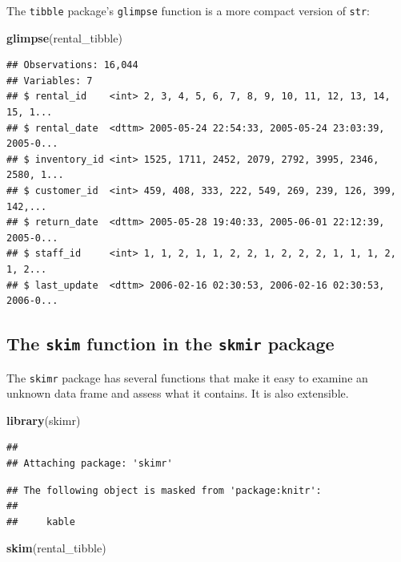 \documentclass[]{book}
\newenvironment{Shaded}{\begin{snugshade}}{\end{snugshade}}
\newcommand{\KeywordTok}[1]{\textcolor[rgb]{0.13,0.29,0.53}{\textbf{#1}}}
\newcommand{\NormalTok}[1]{#1}
\theoremstyle{definition}
\theoremstyle{definition}
\theoremstyle{definition}
\theoremstyle{remark}
\begin{document}
The \texttt{tibble} package's \texttt{glimpse} function is a more
compact version of \texttt{str}:

\begin{Shaded}
\begin{Highlighting}[]
\KeywordTok{glimpse}\NormalTok{(rental_tibble)}
\end{Highlighting}
\end{Shaded}

\begin{verbatim}
## Observations: 16,044
## Variables: 7
## $ rental_id    <int> 2, 3, 4, 5, 6, 7, 8, 9, 10, 11, 12, 13, 14, 15, 1...
## $ rental_date  <dttm> 2005-05-24 22:54:33, 2005-05-24 23:03:39, 2005-0...
## $ inventory_id <int> 1525, 1711, 2452, 2079, 2792, 3995, 2346, 2580, 1...
## $ customer_id  <int> 459, 408, 333, 222, 549, 269, 239, 126, 399, 142,...
## $ return_date  <dttm> 2005-05-28 19:40:33, 2005-06-01 22:12:39, 2005-0...
## $ staff_id     <int> 1, 1, 2, 1, 1, 2, 2, 1, 2, 2, 2, 1, 1, 1, 2, 1, 2...
## $ last_update  <dttm> 2006-02-16 02:30:53, 2006-02-16 02:30:53, 2006-0...
\end{verbatim}

\hypertarget{the-skim-function-in-the-skmir-package}{%
\subsection{\texorpdfstring{The \texttt{skim} function in the
\texttt{skmir}
package}{The skim function in the skmir package}}\label{the-skim-function-in-the-skmir-package}}

The \texttt{skimr} package has several functions that make it easy to
examine an unknown data frame and assess what it contains. It is also
extensible.

\begin{Shaded}
\begin{Highlighting}[]
\KeywordTok{library}\NormalTok{(skimr)}
\end{Highlighting}
\end{Shaded}

\begin{verbatim}
## 
## Attaching package: 'skimr'
\end{verbatim}

\begin{verbatim}
## The following object is masked from 'package:knitr':
## 
##     kable
\end{verbatim}

\begin{Shaded}
\begin{Highlighting}[]
\KeywordTok{skim}\NormalTok{(rental_tibble)}
\end{Highlighting}
\end{Shaded}
\end{document}

